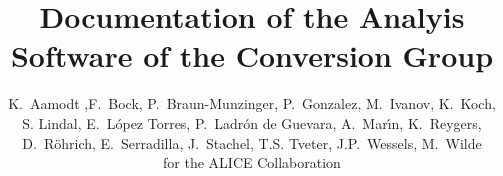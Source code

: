 \documentclass[11pt]{scrreprt} %
\begin{document}
\title{Documentation of the Analyis Software of the Conversion Group}
\author{K.~Aamodt ,F.~Bock, P.~Braun-Munzinger, P.~Gonzalez, M.~Ivanov, K.~Koch,\\
 S. Lindal, E.~L\'opez Torres, P.~Ladr\'on de Guevara, A.~Mar\'{\i}n, K.~Reygers,\\
 D.~R\"ohrich, E.~Serradilla, J.~Stachel, T.S. Tveter, J.P.~Wessels, M.~Wilde \\
for the ALICE Collaboration}
% 
\maketitle
\tableofcontents
\newpage




\begin{appendix}
 	
\end{appendix}
\end{document}
